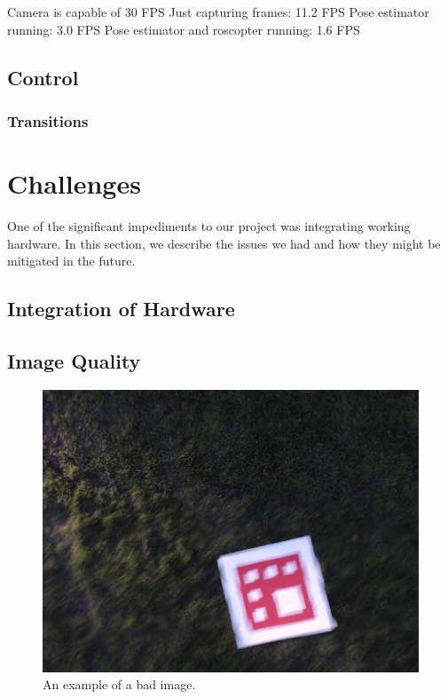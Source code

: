 \documentclass[10pt]{scrartcl} %
\begin{document}
Camera is capable of 30 FPS
Just capturing frames: 11.2 FPS
Pose estimator running: 3.0 FPS
Pose estimator and roscopter running: 1.6 FPS


\subsection{Control}


\subsubsection{Transitions}


\section{Challenges}
One of the significant impediments to our project was integrating working hardware. In this section, we describe the issues we had and how they might be mitigated in the future.

\subsection{Integration of Hardware}

\subsection{Image Quality}

\begin{figure}[h]
    \centering
    \includegraphics[width=\textwidth]{images/badimage.jpg}
    \caption{An example of a bad image.}
    \label{fig:badimage}
\end{figure}
\end{document}
